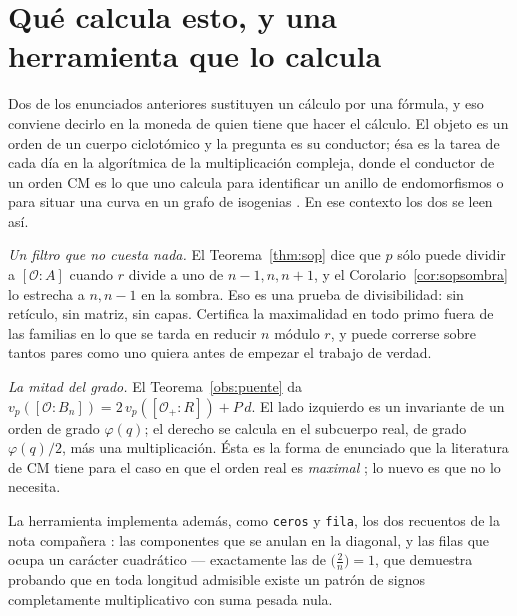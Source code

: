 \documentclass[11pt,a4paper]{article}
\theoremstyle{definition}
\newcommand{\cO}{\mathcal{O}}
\begin{document}
\section{Qu\'e calcula esto, y una herramienta que lo calcula}\label{sec:util}

Dos de los enunciados anteriores sustituyen un c\'alculo por una f\'ormula, y eso conviene decirlo
en la moneda de quien tiene que hacer el c\'alculo. El objeto es un orden de un cuerpo
ciclot\'omico y la pregunta es su conductor; \'esa es la tarea de cada d\'ia en la algor\'itmica de
la multiplicaci\'on compleja, donde el conductor de un orden CM es lo que uno calcula para
identificar un anillo de endomorfismos o para situar una curva en un grafo de isogenias
\cite{IT,BSt13}. En ese contexto los dos se leen as\'i.

\emph{Un filtro que no cuesta nada.} El Teorema~\ref{thm:sop} dice que $p$ s\'olo puede dividir a
$[\cO:A]$ cuando $r$ divide a uno de $n-1,n,n+1$, y el Corolario~\ref{cor:sopsombra} lo estrecha a
$n,n-1$ en la sombra. Eso es una prueba de divisibilidad: sin ret\'iculo, sin matriz, sin capas.
Certifica la maximalidad en todo primo fuera de las familias en lo que se tarda en reducir $n$
m\'odulo $r$,
y puede correrse sobre tantos pares como uno quiera antes de empezar el
trabajo de verdad.

\emph{La mitad del grado.} El Teorema~\ref{obs:puente} da
$v_p([\cO:B_n])=2\,v_p([\cO_+:R])+P\,d$. El lado izquierdo es un invariante de un orden de grado
$\varphi(q)$; el derecho se calcula en el subcuerpo real, de grado $\varphi(q)/2$, m\'as una
multiplicaci\'on. \'Esta es la forma de enunciado que la literatura de CM tiene para el caso en que
el orden real es \emph{maximal} \cite[Lemmas 7, 8]{IT}; lo nuevo es que no lo necesita.

La herramienta implementa adem\'as, como \texttt{ceros} y \texttt{fila}, los dos recuentos de la
nota compa\~nera \cite{II}: las componentes que se anulan en la diagonal, y las filas que ocupa
un car\'acter cuadr\'atico --- exactamente las de $\bigl(\frac2n\bigr)=1$, que \cite{II} demuestra
probando que en toda longitud admisible existe un patr\'on de signos completamente multiplicativo con
suma pesada nula.
\end{document}
